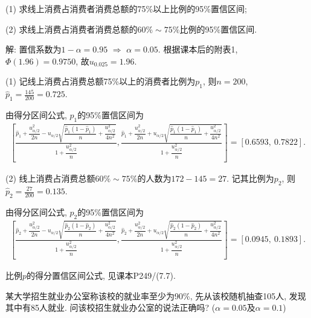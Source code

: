 \documentclass[standard]{ExBook}
\renewenvironment{shaded}{%
  \def\FrameCommand{\fboxsep=\FrameSep \colorbox{shadecolor}}%
  \MakeFramed{\advance\hsize-\width \FrameRestore}%
}{%
  \endMakeFramed
}
\begin{document}
\begin{qitems}
\begin{bbox}
\begin{shaded}
(1) 求线上消费占消费者消费总额的75\%以上比例的95\%置信区间;

(2) 求线上消费占消费者消费总额的$60\%\sim75\%$比例的95\%置信区间.
    \end{shaded}
    \end{bbox}

\vspace{\dimexpr2.5cm-5em\relax}

解: 置信系数为$1-\alpha=0.95$ $\Longrightarrow$ $\alpha=0.05$. 根据课本后的附表1, $\Phi(1.96)=0.9750$, 故$u_{0.025}=1.96$.

(1) 记线上消费占消费总额75\%以上的消费者比例为$p_1$, 则$n=200$, $\widehat{p}_1=\frac{145}{200}=0.725$.

由得分区间公式, $p_1$的95\%置信区间为
$$
\begin{aligned}
\left[
\frac{\widehat{p}_1+\dfrac{u_{\alpha/2}^2}{2n}
-u_{\alpha/2}\sqrt{\dfrac{\widehat{p}_1(1-\widehat{p}_1)}{n}
+\dfrac{u_{\alpha/2}^2}{4n^2}}}
{1+\dfrac{u_{\alpha/2}^2}{n}},
\frac{\widehat{p}_1+\dfrac{u_{\alpha/2}^2}{2n}
+u_{\alpha/2}\sqrt{\dfrac{\widehat{p}_1(1-\widehat{p}_1)}{n}
+\dfrac{u_{\alpha/2}^2}{4n^2}}}
{1+\dfrac{u_{\alpha/2}^2}{n}}
\right]
=
[0.6593,\ 0.7822].
\end{aligned}
$$

(2) 线上消费占消费总额$60\%\sim75\%$的人数为$172-145=27$. 记其比例为$p_2$, 则
$
\widehat{p}_2=\frac{27}{200}=0.135.
$

由得分区间公式, $p_2$的95\%置信区间为
$$
\begin{aligned}
\left[
\frac{\widehat{p}_2+\dfrac{u_{\alpha/2}^2}{2n}
-u_{\alpha/2}\sqrt{\dfrac{\widehat{p}_2(1-\widehat{p}_2)}{n}
+\dfrac{u_{\alpha/2}^2}{4n^2}}}
{1+\dfrac{u_{\alpha/2}^2}{n}},
\frac{\widehat{p}_2+\dfrac{u_{\alpha/2}^2}{2n}
+u_{\alpha/2}\sqrt{\dfrac{\widehat{p}_2(1-\widehat{p}_2)}{n}
+\dfrac{u_{\alpha/2}^2}{4n^2}}}
{1+\dfrac{u_{\alpha/2}^2}{n}}
\right]
=
[0.0945,\ 0.1893].
\end{aligned}
$$

\textcolor{themeColor}{\selectfont {}
比例$p$的得分置信区间公式, 见课本P249/(7.7).}

\vspace{2.5cm-5em}

    \begin{bbox}
    \begin{shaded}
        \qitem
某大学招生就业办公室称该校的就业率至少为90\%, 先从该校随机抽查105人, 发现其中有85人就业. 问该校招生就业办公室的说法正确吗? ($\alpha=0.05$及$\alpha=0.1$)
    \end{shaded}
    \end{bbox}


\end{qitems}
\end{document}
